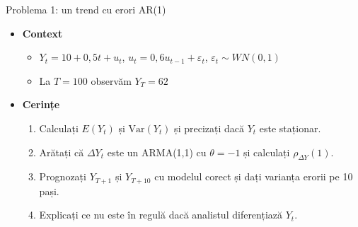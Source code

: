 \begin{frame}{Problema 1: un trend cu erori AR(1)}
\itemsize{\footnotesize}
\begin{itemize}
    \item \textbf{Context}
    \begin{itemize}
        \item $Y_t = 10 + 0{,}5t + u_t$, $u_t = 0{,}6u_{t-1} + \varepsilon_t$, $\varepsilon_t \sim WN(0, 1)$
        \item La $T = 100$ observăm $Y_T = 62$
    \end{itemize}
    \item \textbf{Cerințe}
\begin{enumerate}
    \item Calculați $E(Y_t)$ și $\mathrm{Var}(Y_t)$ și precizați dacă $Y_t$ este staționar.
    \item Arătați că $\Delta Y_t$ este un ARMA(1,1) cu $\theta = -1$ și calculați $\rho_{\Delta Y}(1)$.
    \item Prognozați $Y_{T+1}$ și $Y_{T+10}$ cu modelul corect și dați varianța erorii pe 10 pași.
    \item Explicați ce nu este în regulă dacă analistul diferențiază $Y_t$.
\end{enumerate}
\end{itemize}
\end{frame}

